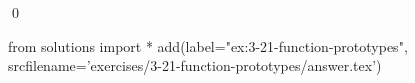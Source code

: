 
\begin{ex}
  \label{ex:3-21-function-prototypes}
  
  \qed
\end{ex}
\begin{python0}
from solutions import *
add(label="ex:3-21-function-prototypes",
    srcfilename='exercises/3-21-function-prototypes/answer.tex')
\end{python0}
